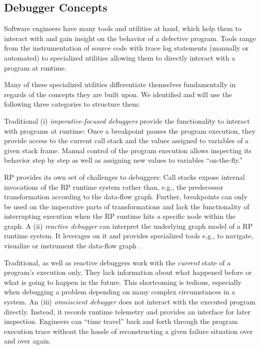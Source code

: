 \documentclass[sigplan,screen]{acmart}
\begin{document}
\subsection{Debugger Concepts}

Software engineers have many tools and utilities at hand, which help them to interact with and gain insight on the behavior of a defective program. Tools range from the instrumentation of source code with trace log statements (manually or automated) to specialized utilities allowing them to directly interact with a program at runtime.

Many of these specialized utilities differentiate themselves fundamentally in regards of the concepts they are built upon. We identified and will use the following three categories to structure them:

Traditional (i) \emph{imperative-focused debuggers} provide the functionality to interact with programs at runtime: Once a breakpoint pauses the program execution, they provide access to the current call stack and the values assigned to variables of a given stack frame. Manual control of the program execution allows inspecting its behavior step by step as well as assigning new values to variables ``on-the-fly.''

RP provides its own set of challenges to debuggers: Call stacks expose internal invocations of the RP runtime system rather than, e.g., the predecessor transformation according to the data-flow graph. Further, breakpoints can only be used on the imperative parts of transformations and lack the functionality of interrupting execution when the RP runtime hits a specific node within the graph. A (ii) \emph{reactive debugger} can interpret the underlying graph model of a RP runtime system. It leverages on it and provides specialized tools e.g., to navigate, visualize or instrument the data-flow graph \cite{10.1145/2884781.2884815} \cite{10.1145/3180155.3180156} \cite{rxviz}.

Traditional, as well as reactive debuggers work with the \emph{current} state of a program's execution only. They lack information about what happened before or what is going to happen in the future. This shortcoming is tedious, especially when debugging a problem depending on many complex circumstances in a system. An (iii) \emph{omniscient debugger} \cite{5287015} \cite{DBLP:journals/corr/OCallahanJFHNP17} does not interact with the executed program directly. Instead, it records runtime telemetry and provides an interface for later inspection. Engineers can ``time travel'' back and forth through the program execution trace without the hassle of reconstructing a given failure situation over and over again.
\end{document}
